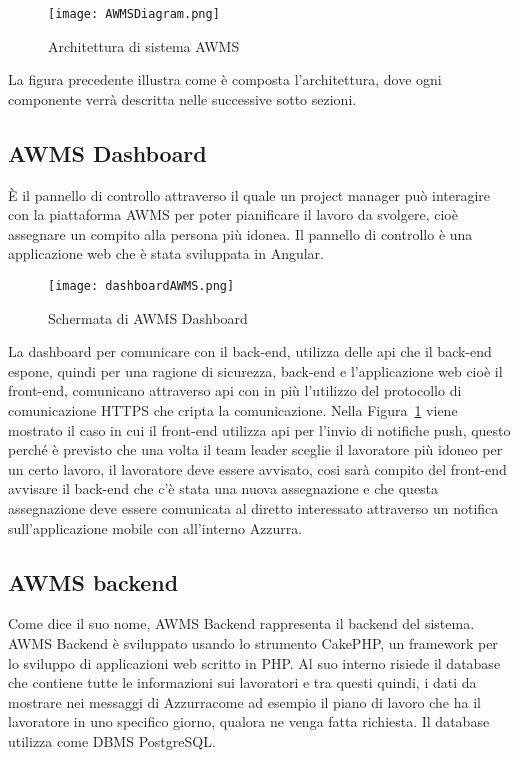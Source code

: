  \begin{figure}[h]
 	\begin{center}
 		\texttt{[image: AWMSDiagram.png]}
 		\caption{Architettura di sistema AWMS}\label{fig:arch}
 	\end{center}
 \end{figure}
La figura precedente illustra come è composta l'architettura, dove ogni componente verrà descritta nelle successive sotto sezioni.
\begin{trivlist}
	\item \subsection{AWMS Dashboard}
	È il pannello di controllo attraverso il quale un project manager può interagire con la piattaforma \gls{AWMS}\ap{[g]} per poter pianificare il lavoro da svolgere, cioè assegnare un compito alla persona più idonea. Il pannello di controllo è una applicazione web che è stata sviluppata in Angular.
	\begin{figure}[h] 
		\begin{center}
			\texttt{[image: dashboardAWMS.png]}
			\caption{Schermata di AWMS Dashboard}
		\end{center}
	\end{figure}
	 	La dashboard per comunicare con il back-end, utilizza delle \gls{api}\ap{[g]} che il back-end espone, quindi per una ragione di sicurezza, back-end e l'applicazione web cioè il front-end, comunicano attraverso \gls{api}\ap{[g]} con in più l'utilizzo del protocollo di comunicazione HTTPS che cripta la comunicazione. Nella Figura~\ref{fig:arch} viene mostrato il caso in cui il front-end utilizza \gls{api}\ap{[g]} per l'invio di notifiche push, questo perché è previsto che una volta il team leader sceglie il lavoratore più idoneo per un certo lavoro, il lavoratore deve essere avvisato, cosi sarà compito del front-end avvisare il back-end che c'è stata una nuova assegnazione e che questa assegnazione deve essere comunicata al diretto interessato attraverso un notifica sull'applicazione mobile con all'interno Azzurra.
	\item \subsection{AWMS backend}
	Come dice il suo nome, AWMS Backend rappresenta il backend del sistema. AWMS Backend è sviluppato usando lo strumento CakePHP, un framework per lo sviluppo di applicazioni web scritto in PHP. Al suo interno risiede il database che contiene tutte le informazioni sui lavoratori e tra questi quindi, i dati da mostrare nei messaggi di Azzurracome ad esempio il piano di lavoro che ha il lavoratore in uno specifico giorno, qualora ne venga fatta richiesta. Il database utilizza come DBMS PostgreSQL. \\

\end{trivlist}
